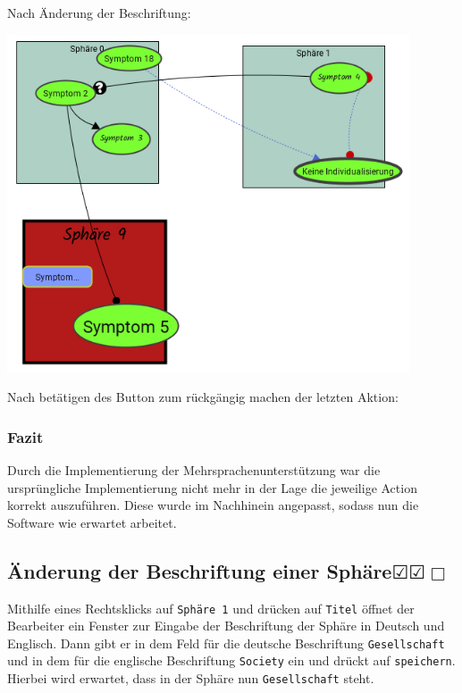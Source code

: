 \documentclass[enabledeprecatedfontcommands]{scrartcl}
\newcommand{\subsectiont}[2]{\subsection[#1]{#1{\normalsize\normalfont #2}}}
\newcommand{\leer}{$\Box$}
\newcommand{\ok}{$\CheckedBox$}
\begin{document}
Nach Änderung der Beschriftung: 
\begin{center}
\includegraphics[height=10cm]{3_48.PNG}
\end{center}
Nach betätigen des Button zum rückgängig machen der letzten Aktion: 

\subsubsection{Fazit}
Durch die Implementierung der Mehrsprachenunterstützung war die ursprüngliche Implementierung nicht mehr in der Lage die jeweilige Action korrekt auszuführen. Diese wurde im Nachhinein angepasst, sodass nun die Software wie erwartet arbeitet.

\subsectiont{Änderung der Beschriftung einer Sphäre}{\dotfill\ok\ok\leer}
Mithilfe eines Rechtsklicks auf \texttt{Sphäre 1} und drücken auf \texttt{Titel} öffnet der Bearbeiter ein Fenster zur Eingabe der Beschriftung der Sphäre in Deutsch und Englisch. Dann gibt er in dem Feld für die deutsche Beschriftung \texttt{Gesellschaft}  und in dem für die englische Beschriftung \texttt{Society} ein und drückt auf \texttt{speichern}. Hierbei wird erwartet, dass in der Sphäre nun \texttt{Gesellschaft} steht. 
\end{document}
